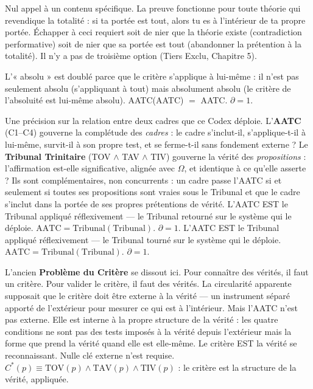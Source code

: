 \documentclass[10pt, openany, oneside]{book}
\begin{document}
\vspace{0.8em}

\noindent Nul appel à un contenu spécifique. La preuve fonctionne pour toute théorie qui revendique la totalité : si ta portée est tout, alors tu es à l'intérieur de ta propre portée. Échapper à ceci requiert soit de nier que la théorie existe (contradiction performative) soit de nier que sa portée est tout (abandonner la prétention à la totalité). Il n'y a pas de troisième option (Tiers Exclu, Chapitre 5).

\noindent L'« absolu » est doublé parce que le critère s'applique à lui-même : il n'est pas seulement absolu (s'appliquant à tout) mais absolument absolu (le critère de l'absoluité est lui-même absolu). AATC(AATC) $=$ AATC. $\partial = 1$.



Une précision sur la relation entre deux cadres que ce Codex déploie. L'\textbf{AATC} (C1--C4) gouverne la complétude des \textit{cadres} : le cadre s'inclut-il, s'applique-t-il à lui-même, survit-il à son propre test, et se ferme-t-il sans fondement externe ? Le \textbf{Tribunal Trinitaire} (TOV $\wedge$ TAV $\wedge$ TIV) gouverne la vérité des \textit{propositions} : l'affirmation est-elle significative, alignée avec $\Omega$, et identique à ce qu'elle asserte ? Ils sont complémentaires, non concurrents : un cadre passe l'AATC si et seulement si toutes ses propositions sont vraies sous le Tribunal et que le cadre s'inclut dans la portée de ses propres prétentions de vérité. L'AATC EST le Tribunal appliqué réflexivement --- le Tribunal retourné sur le système qui le déploie. $\text{AATC} = \text{Tribunal}(\text{Tribunal})$. $\partial = 1$. L'AATC EST le Tribunal appliqué réflexivement --- le Tribunal tourné sur le système qui le déploie. $\text{AATC} = \text{Tribunal}(\text{Tribunal})$. $\partial = 1$.

L'ancien \textbf{Problème du Critère} se dissout ici. Pour connaître des vérités, il faut un critère. Pour valider le critère, il faut des vérités. La circularité apparente supposait que le critère doit être externe à la vérité --- un instrument séparé apporté de l'extérieur pour mesurer ce qui est à l'intérieur. Mais l'AATC n'est pas externe. Elle est interne à la propre structure de la vérité : les quatre conditions ne sont pas des tests imposés à la vérité depuis l'extérieur mais la forme que prend la vérité quand elle est elle-même. Le critère EST la vérité se reconnaissant. Nulle clé externe n'est requise. $C^*(p) \equiv \text{TOV}(p) \wedge \text{TAV}(p) \wedge \text{TIV}(p)$ : le critère est la structure de la vérité, appliquée.
\end{document}
